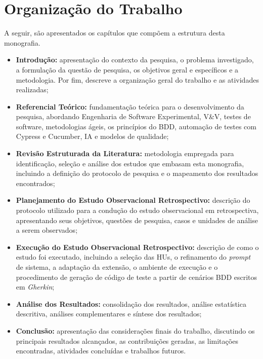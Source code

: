 \section{Organização do Trabalho}
\label{sec:organizacao}

A seguir, são apresentados os capítulos que compõem a estrutura desta monografia.

\begin{itemize}
    \item \textbf{Introdução:} apresentação do contexto da pesquisa, o problema investigado, a formulação da questão de pesquisa, os objetivos geral e específicos e a metodologia. Por fim, descreve a organização geral do trabalho e as atividades realizadas;
    \item \textbf{Referencial Teórico:} fundamentação teórica para o desenvolvimento da pesquisa, abordando Engenharia de Software Experimental, V\&V, testes de software, metodologias ágeis, os princípios do BDD, automação de testes com Cypress e Cucumber, IA e modelos de qualidade;
    \item \textbf{Revisão Estruturada da Literatura:} metodologia empregada para identificação, seleção e análise dos estudos que embasam esta monografia, incluindo a definição do protocolo de pesquisa e o mapeamento dos resultados encontrados;
    \item \textbf{Planejamento do Estudo Observacional Retrospectivo:} descrição do protocolo utilizado para a condução do estudo observacional em retrospectiva, apresentando seus objetivos, questões de pesquisa, casos e unidades de análise a serem observados;
    \item \textbf{Execução do Estudo Observacional Retrospectivo:} descrição de como o estudo foi executado, incluindo a seleção das HUs, o refinamento do \textit{prompt} de sistema, a adaptação da extensão, o ambiente de execução e o procedimento de geração de código de teste a partir de cenários BDD escritos em \textit{Gherkin};
    \item \textbf{Análise dos Resultados:} consolidação dos resultados, análise estatística descritiva, análises complementares e síntese dos resultados;
    \item \textbf{Conclusão:} apresentação das considerações finais do trabalho, discutindo os principais resultados alcançados, as contribuições geradas, as limitações encontradas, atividades concluídas e trabalhos futuros.
\end{itemize}

